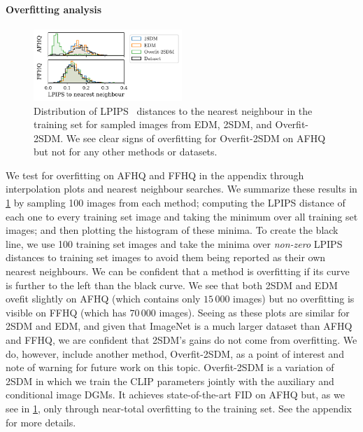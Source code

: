 \paragraph{Overfitting analysis}
\begin{figure}
    \centering
    \includegraphics[width=0.5\textwidth]{figs/2sdm/afhq_ffhq.pdf}
    \caption{Distribution of LPIPS~\citep{zhang2018perceptual} distances to the nearest neighbour in the training set for sampled images from EDM, 2SDM, and Overfit-2SDM. We see clear signs of overfitting for Overfit-2SDM on AFHQ but not for any other methods or datasets. }
    \label{fig:overfit-2SDM-nearest-neighbours}
\end{figure}
We test for overfitting on AFHQ and FFHQ in the appendix through interpolation plots and nearest neighbour searches.
We summarize these results in \cref{fig:overfit-2SDM-nearest-neighbours} by sampling 100 images from each method; computing the LPIPS distance of each one to every training set image and taking the minimum over all training set images; and then plotting the histogram of these minima. To create the black line, we use 100 training set images and take the minima over \textit{non-zero} LPIPS distances to training set images to avoid them being reported as their own nearest neighbours. We can be confident that a method is overfitting if its curve is further to the left than the black curve. We see that both 2SDM and EDM ovefit slightly on AFHQ (which contains only $15\,000$ images) but no overfitting is visible on FFHQ (which has $70\,000$ images). Seeing as these plots are similar for 2SDM and EDM, and given that ImageNet is a much larger dataset than AFHQ and FFHQ, we are confident that 2SDM's gains do not come from overfitting. We do, however, include another method, Overfit-2SDM, as a point of interest and note of warning for future work on this topic. Overfit-2SDM is a variation of 2SDM in which we train the CLIP parameters jointly with the auxiliary and conditional image DGMs. It achieves state-of-the-art FID on AFHQ but, as we see in \cref{fig:overfit-2SDM-nearest-neighbours}, only through near-total overfitting to the training set. See the appendix for more details.

